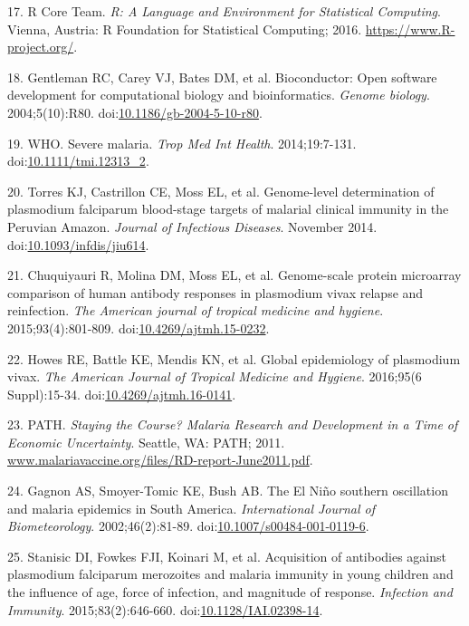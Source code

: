 \documentclass[]{article}
\begin{document}
\hypertarget{ref-R2016}{}
17. R Core Team. \emph{R: A Language and Environment for Statistical
Computing}. Vienna, Austria: R Foundation for Statistical Computing;
2016. \url{https://www.R-project.org/}.

\hypertarget{ref-bioconductor2004}{}
18. Gentleman RC, Carey VJ, Bates DM, et al. Bioconductor: Open software
development for computational biology and bioinformatics. \emph{Genome
biology}. 2004;5(10):R80.
doi:\href{https://doi.org/10.1186/gb-2004-5-10-r80}{10.1186/gb-2004-5-10-r80}.

\hypertarget{ref-WHO2014severe}{}
19. WHO. Severe malaria. \emph{Trop Med Int Health}. 2014;19:7-131.
doi:\href{https://doi.org/10.1111/tmi.12313_2}{10.1111/tmi.12313\_2}.

\hypertarget{ref-Torres2014asymptomatic}{}
20. Torres KJ, Castrillon CE, Moss EL, et al. Genome-level determination
of plasmodium falciparum blood-stage targets of malarial clinical
immunity in the Peruvian Amazon. \emph{Journal of Infectious Diseases}.
November 2014.
doi:\href{https://doi.org/10.1093/infdis/jiu614}{10.1093/infdis/jiu614}.

\hypertarget{ref-chuquiyauri2015vivax}{}
21. Chuquiyauri R, Molina DM, Moss EL, et al. Genome-scale protein
microarray comparison of human antibody responses in plasmodium vivax
relapse and reinfection. \emph{The American journal of tropical medicine
and hygiene}. 2015;93(4):801-809.
doi:\href{https://doi.org/10.4269/ajtmh.15-0232}{10.4269/ajtmh.15-0232}.

\hypertarget{ref-howes2016global}{}
22. Howes RE, Battle KE, Mendis KN, et al. Global epidemiology of
plasmodium vivax. \emph{The American Journal of Tropical Medicine and
Hygiene}. 2016;95(6 Suppl):15-34.
doi:\href{https://doi.org/10.4269/ajtmh.16-0141}{10.4269/ajtmh.16-0141}.

\hypertarget{ref-path2011}{}
23. PATH. \emph{Staying the Course? Malaria Research and Development in
a Time of Economic Uncertainty}. Seattle, WA: PATH; 2011.
\url{www.malariavaccine.org/files/RD-report-June2011.pdf}.

\hypertarget{ref-gagnon2002enso}{}
24. Gagnon AS, Smoyer-Tomic KE, Bush AB. The El Niño southern
oscillation and malaria epidemics in South America. \emph{International
Journal of Biometeorology}. 2002;46(2):81-89.
doi:\href{https://doi.org/10.1007/s00484-001-0119-6}{10.1007/s00484-001-0119-6}.

\hypertarget{ref-Stanisic2015}{}
25. Stanisic DI, Fowkes FJI, Koinari M, et al. Acquisition of antibodies
against plasmodium falciparum merozoites and malaria immunity in young
children and the influence of age, force of infection, and magnitude of
response. \emph{Infection and Immunity}. 2015;83(2):646-660.
doi:\href{https://doi.org/10.1128/IAI.02398-14}{10.1128/IAI.02398-14}.
\end{document}
